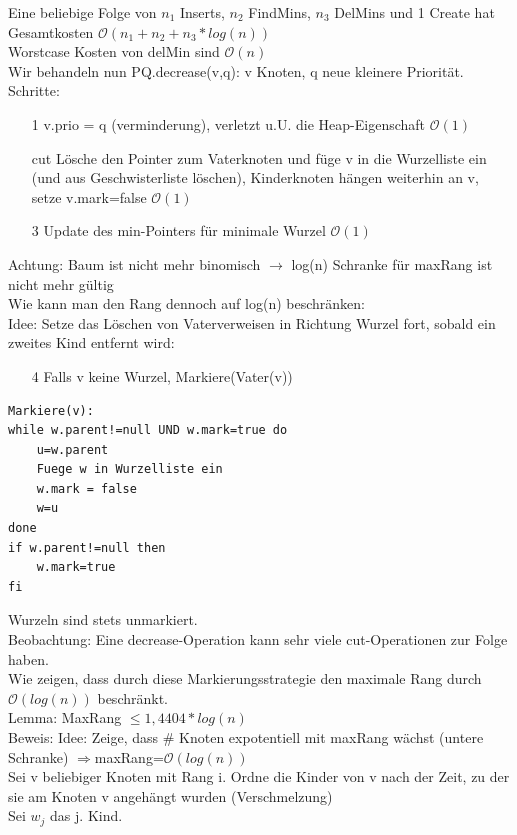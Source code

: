 \documentclass[a4paper]{article}
\newcommand{\oh}[1]{$\mathcal{O}(#1)$}
\begin{document}
Eine beliebige Folge von $n_1$ Inserts, $n_2$ FindMins, $n_3$ DelMins und 1 Create hat Gesamtkosten \oh{n_1+n_2+n_3*log(n)}\\
Worstcase Kosten von delMin sind \oh{n}\\
Wir behandeln nun PQ.decrease(v,q): v Knoten, q neue kleinere Priorität.\\
Schritte:\begin{enumerate}
\item[1] v.prio = q (verminderung), verletzt u.U. die Heap-Eigenschaft \oh{1}
\item[cut] Lösche den Pointer zum Vaterknoten und füge v in die Wurzelliste ein (und aus Geschwisterliste löschen), Kinderknoten hängen weiterhin an v, setze v.mark=false \oh{1}
\item[3] Update des min-Pointers für minimale Wurzel \oh{1}

\end{enumerate}
Achtung: Baum ist nicht mehr binomisch $\rightarrow$ log(n) Schranke für maxRang ist nicht mehr gültig\\
Wie kann man den Rang dennoch auf log(n) beschränken:\\
Idee: Setze das Löschen von Vaterverweisen in Richtung Wurzel fort, sobald ein zweites Kind entfernt wird:
\begin{enumerate}
\item[4] Falls v keine Wurzel, Markiere(Vater(v))
\end{enumerate}
\begin{lstlisting}
Markiere(v):
while w.parent!=null UND w.mark=true do
	u=w.parent
	Fuege w in Wurzelliste ein
	w.mark = false
	w=u
done
if w.parent!=null then
	w.mark=true
fi
\end{lstlisting}
Wurzeln sind stets unmarkiert.\\
Beobachtung: Eine decrease-Operation kann sehr viele cut-Operationen zur Folge haben.\\
Wie zeigen, dass durch diese Markierungsstrategie den maximale Rang durch \oh{log(n)} beschränkt.\\
Lemma: MaxRang $\leq 1,4404* log(n)$\\
Beweis: Idee: Zeige, dass \# Knoten expotentiell mit maxRang wächst (untere Schranke) $\Rightarrow $maxRang=\oh{log(n)}\\
Sei v beliebiger Knoten mit Rang i. Ordne die Kinder von v nach der Zeit, zu der sie am Knoten v angehängt wurden (Verschmelzung)\\
Sei $w_j$ das j. Kind.\\
\end{document}

